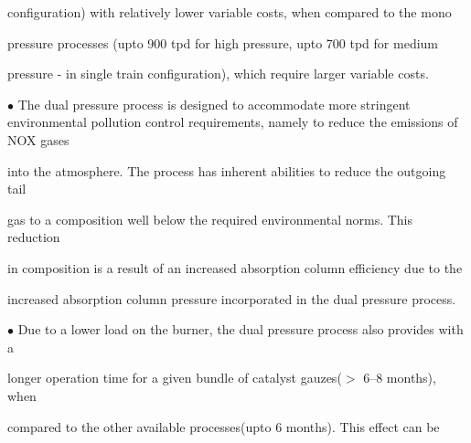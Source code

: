 \documentclass[a4paper,portrait,12pt]{article}
\begin{document}
\begin{flushleft}
configuration) with relatively lower variable costs, when compared to the mono
\end{flushleft}


\begin{flushleft}
pressure processes (upto 900 tpd for high pressure, upto 700 tpd for medium
\end{flushleft}


\begin{flushleft}
pressure - in single train configuration), which require larger variable costs.
\end{flushleft}


\begin{flushleft}
$\bullet$ The dual pressure process is designed to accommodate more stringent environmental pollution control requirements, namely to reduce the emissions of NOX gases
\end{flushleft}


\begin{flushleft}
into the atmosphere. The process has inherent abilities to reduce the outgoing tail
\end{flushleft}


\begin{flushleft}
gas to a composition well below the required environmental norms. This reduction
\end{flushleft}


\begin{flushleft}
in composition is a result of an increased absorption column efficiency due to the
\end{flushleft}


\begin{flushleft}
increased absorption column pressure incorporated in the dual pressure process.
\end{flushleft}


\begin{flushleft}
$\bullet$ Due to a lower load on the burner, the dual pressure process also provides with a
\end{flushleft}


\begin{flushleft}
longer operation time for a given bundle of catalyst gauzes($>$ 6--8 months), when
\end{flushleft}


\begin{flushleft}
compared to the other available processes(upto 6 months). This effect can be
\end{flushleft}
\end{document}
